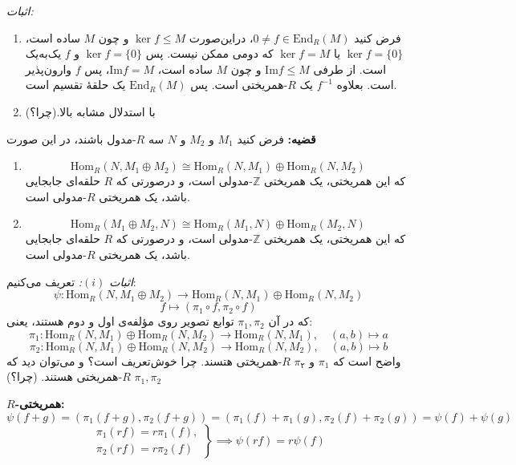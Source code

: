 \textit{اثبات:}
\begin{enumerate}
    \item فرض کنید \( 0 \neq f \in \mathrm{End}_R(M) \)، دراین‌صورت \(\ker f \leqslant M\) و چون \( M \) ساده است، \(\ker f = \{0\}\) یا \(\ker f = M\) که دومی ممکن نیست. پس \(\ker f = \{0\}\) و \( f \) یک‌به‌یک است. از طرفی \(\mathrm{Im} f \leqslant M\) و چون \( M \) ساده است، \(\mathrm{Im} f = M\)، پس
          \( f \)
          وارون‌پذیر
          است.
          بعلاوه
          \( f^{-1} \)
          یک
          \(R\)-همریختی
          است. پس
          \( \mathrm{End}_R(M) \)
          یک حلقهٔ تقسیم است.
    \item با استدلال مشابه بالا.(چرا؟)
\end{enumerate}

\hrulefill

\textbf{قضیه:}
فرض کنید
\(M_1\)
و
\(M_2\)
و
\(N\)
سه
\(R\)-مدول
باشند، در این صورت
\begin{enumerate}
    \item \[
              \mathrm{Hom}_R(N, M_1 \oplus M_2) \cong \mathrm{Hom}_R(N,M_1) \oplus \mathrm{Hom}_R(N,M_2)
          \]
          که این همریختی،‌ یک همریختی
          \(\mathbb{Z}\)-مدولی
          است، و درصورتی که
          \(R\)
          حلقه‌ای جابجایی باشد، یک همریختی
          \(R\)-مدولی
          است.
    \item \[
              \mathrm{Hom}_R(M_1 \oplus M_2, N) \cong \mathrm{Hom}_R(M_1,N) \oplus \mathrm{Hom}_R(M_2,N)
          \]
          که این همریختی،‌ یک همریختی
          \(\mathbb{Z}\)-مدولی
          است، و درصورتی که
          \(R\)
          حلقه‌ای جابجایی باشد، یک همریختی
          \(R\)-مدولی
          است.
\end{enumerate}

\textit{اثبات \((i)\):}   تعریف می‌کنیم:
\[
    \psi : \mathrm{Hom}_R(N, M_1 \oplus M_2) \to \mathrm{Hom}_R(N, M_1) \oplus \mathrm{Hom}_R(N, M_2)
\]
\[
    f \mapsto (\pi_1 \circ f, \pi_2 \circ f)
\]
که در آن \( \pi_1, \pi_2 \) توابع تصویر روی مؤلفه‌ی اول و دوم هستند، یعنی:
\[
    \pi_1 : \mathrm{Hom}_R(N,M_1) \oplus \mathrm{Hom}_R(N,M_2) \to \mathrm{Hom}_R(N,M_1), \quad (a,b) \mapsto a
\]
\[
    \pi_2 : \mathrm{Hom}_R(N,M_1) \oplus \mathrm{Hom}_R(N,M_2) \to \mathrm{Hom}_R(N,M_2), \quad (a,b) \mapsto b
\]
واضح است که
\(\pi_1\)
و
\(\pi_۲\)
\(R\)-همریختی
هتسند. چرا خوش‌تعریف است؟
و می‌توان دید که \( \pi_1, \pi_2 \) \( R \)-همریختی هستند. (چرا؟)

\textbf{\(R\)-همریختی:}
\[
    \psi(f+g) = (\pi_1(f+g), \pi_2(f+g)) = (\pi_1(f)+\pi_1(g), \pi_2(f)+\pi_2(g)) = \psi(f) + \psi(g)
\]
\[
    \left.
    \begin{aligned}
        \pi_1(rf) = r\pi_1(f), \\
        \pi_2(rf) = r\pi_2(f)
    \end{aligned}
    \right\}
    \implies \psi(rf) = r \psi(f)
\]


